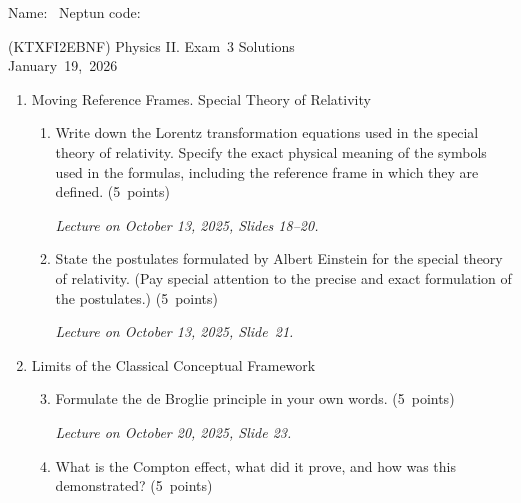 \documentclass[a4paper,12pt]{letter}
\begin{document}
Name: \hrulefill\ Neptun code: \hrulefill

\bigskip

\begin{center}
(KTXFI2EBNF) Physics II. Exam~3 Solutions\\
January~19,~2026
\end{center}

\bigskip
 
\begin{enumerate}[label=\Roman*.]
   
\item Moving Reference Frames. Special Theory of Relativity

\begin{enumerate}[label=\arabic*.]
\setcounter{enumii}{0} %

\item  Write down the Lorentz transformation equations used in the special theory of relativity. Specify the exact physical meaning of the symbols used in the formulas, including the reference frame in which they are defined. \hfill (5~points)

\smallskip
\textit{Lecture on October 13, 2025, Slides 18--20.}

\item State the postulates formulated by Albert Einstein for the special theory of relativity. (Pay special attention to the precise and exact formulation of the postulates.) \hfill (5~points)

\smallskip
\textit{Lecture on October 13, 2025, Slide~21.}

\end{enumerate}


\item Limits of the Classical Conceptual Framework

\begin{enumerate}[label=\arabic*.]
\setcounter{enumii}{2} %

\item Formulate the de Broglie principle in your own words. \hfill (5~points)

\smallskip
\textit{Lecture on October 20, 2025, Slide 23.}
  
\item What is the Compton effect, what did it prove, and how was this demonstrated? \hfill (5~points)


\end{enumerate}
\end{enumerate}
\end{document}
